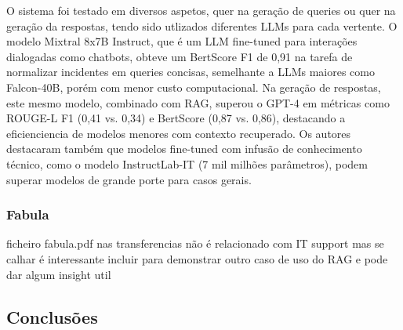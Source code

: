 O sistema foi testado em diversos aspetos, quer na geração de queries ou quer na geração da respostas, tendo sido utlizados diferentes LLMs para cada vertente. O modelo Mixtral 8x7B Instruct, que é um LLM fine-tuned para interações dialogadas como chatbots, obteve um BertScore F1 de 0,91 na tarefa de normalizar incidentes em queries concisas, semelhante a LLMs maiores como Falcon-40B, porém com menor custo computacional. Na geração de respostas, este mesmo modelo, combinado com RAG, superou o GPT-4 em métricas como ROUGE-L F1 (0,41 vs. 0,34) e BertScore (0,87 vs. 0,86), destacando a eficienciencia de modelos menores com contexto recuperado. Os autores destacaram também que modelos fine-tuned com infusão de conhecimento técnico, como o modelo InstructLab-IT (7 mil milhões parâmetros), podem superar modelos de grande porte para casos gerais. 



\subsubsection{Fabula}

ficheiro fabula.pdf nas transferencias
não é relacionado com IT support mas se calhar é interessante incluir para demonstrar outro caso de uso do RAG e pode dar algum insight util

\subsection{Conclusões}





